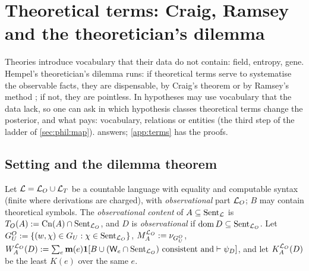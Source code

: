 \section{Theoretical terms: Craig, Ramsey and the theoretician's dilemma}\label{sec:terms}

Theories introduce vocabulary that their data do not contain: field, entropy, gene. Hempel's theoretician's dilemma \citep{hempel1958theoretician} runs: if theoretical terms serve to systematise the observable facts, they are dispensable, by Craig's theorem \citep{craig1953axiomatizability} or by Ramsey's method \citep{ramsey1931theories}; if not, they are pointless. In \SAI hypotheses may use vocabulary that the data lack, so one can ask in which hypothesis classes theoretical terms change the posterior, and what pays: vocabulary, relations or entities (the third step of the ladder of \cref{sec:phil:map}).  answers; \cref{app:terms} has the proofs.

\subsection{Setting and the dilemma theorem}\label{sec:terms:setting}

\begin{definition}\label{def:terms:obs}
Let $\mathcal L=\mathcal{L}_{O}\cup\mathcal{L}_{T}$ be a countable language with equality and computable syntax (finite where derivations are charged), with \emph{observational} part $\mathcal{L}_{O}$; $B$ may contain theoretical symbols. The \emph{observational content} of $A\subseteq\mathrm{Sent}_{\mathcal L}$ is $T_O(A):=\mathrm{Cn}(A)\cap\mathrm{Sent}_{\mathcal{L}_{O}}$, and $D$ is \emph{observational} if $\operatorname{dom} D\subseteq\mathrm{Sent}_{\mathcal{L}_{O}}$. Let $G_U^O:=\{(w,\chi)\in G_U:\chi\in\mathrm{Sent}_{\mathcal{L}_{O}}\}$, $M_{A}^{\mathcal{L}_{O}}:=\nu_{G_U^O}$, $W_{A}^{\mathcal{L}_{O}}(D):=\sum_e\mathbf{m}(e)\mathbf{1}[B\cup(\mathsf{W}_{e}\cap\mathrm{Sent}_{\mathcal{L}_{O}})\text{ consistent and}\vdash\psi_D]$, and let $K_{A}^{\mathcal{L}_{O}}(D)$ be the least $K(e)$ over the same $e$.
\end{definition}

